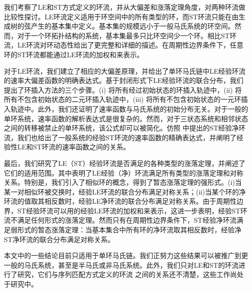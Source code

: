 我们考察了LE和ST方式定义的环流，并从大偏差和涨落定理角度，对两种环流做比较性探讨。LE环流定义适用于环空间中的所有类型的环，而ST环流只能在由生成树的弦产生的基本集中定义。基本集的规模远小于一般马氏系统的环空间。然而，对于一个环拓扑结构的系统，基本集最多只比环空间少一个环。相比ST环流，LE环流对环动态性给出了更完整和详细的描述。在周期性边界条件下，任意环的ST环流都能通过LE环流的加权和来表示。

对于LE环流，我们建立了相应的大偏差原理，并给出了单环马氏链中LE经验环流的速率大偏差函数的明确表达式。基于封闭形式下LE经验环流的联合分布，我们提出了环插入方法的三个步骤。(i) 将所有经过初始状态的环插入轨迹中，(ii) 将所有不包含初始状态的二元环插入轨迹中，(iii) 将所有不包含初始状态的一元环插入轨迹中。此外，我们还证明了速率函数与马氏系统的初始分布无关。对于一般的单环系统，速率函数的解析表达式是很复杂的。然而，对于三状态系统和相邻状态之间的转移被禁止的单环系统，该公式却可以被简化。仿照 \cite{bertini2015flows} 中提出的ST经验净环流，我们也给出了一般系统的经验ST环流的速率函数的精确表达式，并阐明了经验性LE和ST环流的速率函数之间的关系。

最后，我们研究了LE（ST）经验环流是否满足的各种类型的涨落定理，并阐述了它们的适用范围。其中表明了LE经验（净）环流满足所有类型的涨落定理和对称关系。特别是，我们引入了相似环的概念，得到了暂态涨落定理的强形式。(i)当某一对相似环被交换时，经验LE环流的联合分布满足对称关系；(ii)当某个环的净环流的值取其相反数时，经验LE净环流的联合分布满足对称关系。由于周期性边界，ST经验环流可以用的经验LE环流的加权和来表示，这进一步表明，经验ST环流不满足任何形式的涨落定理。然而只有在周期性边界条件下，ST经验净环流满足弱形式的暂态涨落定理：当基本集合中所有环的净环流取其相反数时，经验净ST净环流的联合分布满足对称关系。

本文中的一些结论目前只适用于单环马氏链。我们正努力这些结果可以被推广到更一般的马氏系统，甚至是半马氏或非马氏系统。此外，我们只对LE和ST的环流进行了研究，它们与序列匹配方式定义的环流 \cite{roldan2019exact,biddle2020reversal,pietzonka2021cycle} 之间的关系还不清楚，这些工作尚处于研究中。